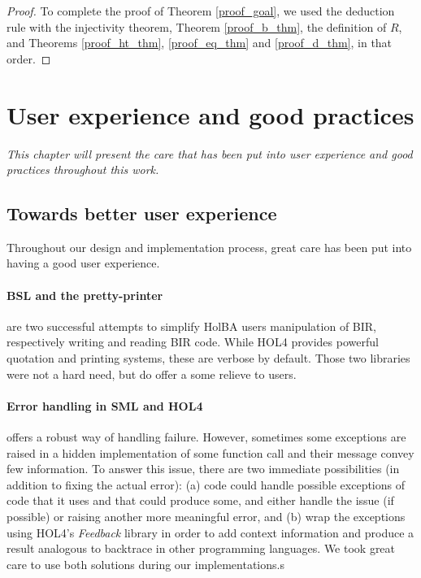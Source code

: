 \documentclass[10pt,a4paper]{article}
\begin{document}
\begin{multicols}{2}
\begin{proof}
To complete the proof of Theorem \ref{proof_goal}, we used the deduction rule with the injectivity theorem, Theorem \ref{proof_b_thm}, the definition of $R$, and Theorems \ref{proof_ht_thm}, \ref{proof_eq_thm} and \ref{proof_d_thm}, in that order.

\end{proof}


\section{User experience and good practices} \label{user-friendliness}
\textit{This chapter will present the care that has been put into user experience and good practices throughout this work.}

\subsection{Towards better user experience} \label{towards-user-exp}

Throughout our design and implementation process, great care has been put into having a good user experience.

\vspace{-8pt}
\paragraph{BSL and the pretty-printer} are two successful attempts to simplify HolBA users manipulation of BIR, respectively writing and reading BIR code. While HOL4 provides powerful quotation and printing systems, these are verbose by default. Those two libraries were not a hard need, but do offer a some relieve to users.

\vspace{-8pt}
\paragraph{Error handling in SML and HOL4} offers a robust way of handling failure. However, sometimes some exceptions are raised in a hidden implementation of some function call and their message convey few information. To answer this issue, there are two immediate possibilities (in addition to fixing the actual error): (a) code could handle possible exceptions of code that it uses and that could produce some, and either handle the issue (if possible) or raising another more meaningful error, and (b) wrap the exceptions using HOL4's \textit{Feedback} library in order to add context information and produce a result analogous to backtrace in other programming languages. We took great care to use both solutions during our implementations.s


\end{multicols}
\end{document}
